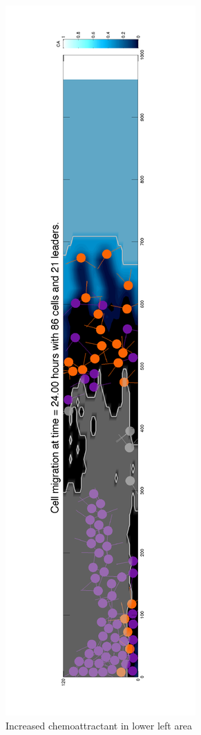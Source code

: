 \documentclass[portrait,a0paper,fontscale=0.292]{baposter}
\begin{document}
\begin{poster}
{\begin{minipage}{250pt}
	\includegraphics[trim=68 30 25 200, clip,scale=0.35,angle=270]{modelAdjacent-crop}\\%
	\hspace*{3pt} Increased chemoattractant in lower left area\\[-5pt]

\end{minipage}}
\end{poster}
\end{document}
